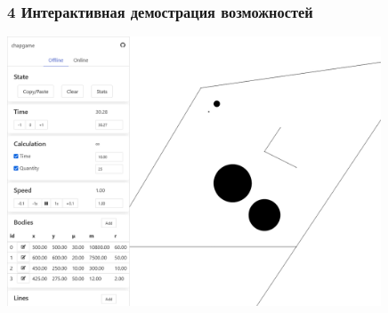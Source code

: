 \documentclass[xetex,aspectratio=43]{beamer}
\newenvironment{Underequation}{
    \small
    \noindent
    где
    \hspace{-1.45ex}
    \setlength{\parindent}{3.5ex}
}{}
\begin{document}












\begin{frame}
    \frametitle{4 Интерактивная демострация возможностей}

    \includegraphics[height=8cm]{chapgame_1}

\end{frame}
\end{document}
